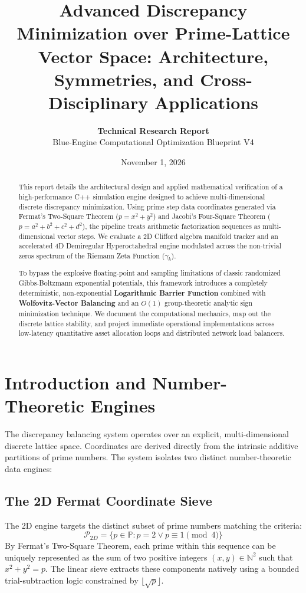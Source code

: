 \documentclass[11pt,a4paper]{article}
\title{\textbf{Advanced Discrepancy Minimization over Prime-Lattice Vector Space: Architecture, Symmetries, and Cross-Disciplinary Applications}}
\author{\textbf{Technical Research Report} \\ Blue-Engine Computational Optimization Blueprint V4}
\date{November 1, 2026}
\begin{document}
\maketitle

\begin{abstract}
This report details the architectural design and applied mathematical verification of a high-performance C++ simulation engine designed to achieve multi-dimensional discrete discrepancy minimization. Using prime step data coordinates generated via Fermat's Two-Square Theorem ($p = x^2 + y^2$) and Jacobi's Four-Square Theorem ($p = a^2 + b^2 + c^2 + d^2$), the pipeline treats arithmetic factorization sequences as multi-dimensional vector steps. We evaluate a 2D Clifford algebra manifold tracker and an accelerated 4D Demiregular Hyperoctahedral engine modulated across the non-trivial zeros spectrum of the Riemann Zeta Function ($\gamma_k$). 

To bypass the explosive floating-point and sampling limitations of classic randomized Gibbs-Boltzmann exponential potentials, this framework introduces a completely deterministic, non-exponential \textbf{Logarithmic Barrier Function} combined with \textbf{Wolfovitz-Vector Balancing} and an $O(1)$ group-theoretic analytic sign minimization technique. We document the computational mechanics, map out the discrete lattice stability, and project immediate operational implementations across low-latency quantitative asset allocation loops and distributed network load balancers.
\end{abstract}

\section{Introduction and Number-Theoretic Engines}
The discrepancy balancing system operates over an explicit, multi-dimensional discrete lattice space. Coordinates are derived directly from the intrinsic additive partitions of prime numbers. The system isolates two distinct number-theoretic data engines:

\subsection{The 2D Fermat Coordinate Sieve}
The 2D engine targets the distinct subset of prime numbers matching the criteria:
\begin{equation}
\mathcal{P}_{2D} = \{p \in \mathbb{P} : p = 2 \lor p \equiv 1 \pmod 4\}
\end{equation}
By Fermat's Two-Square Theorem, each prime within this sequence can be uniquely represented as the sum of two positive integers $(x, y) \in \mathbb{N}^2$ such that $x^2 + y^2 = p$. The linear sieve extracts these components natively using a bounded trial-subtraction logic constrained by $\lfloor\sqrt{p}\rfloor$.
\end{document}
